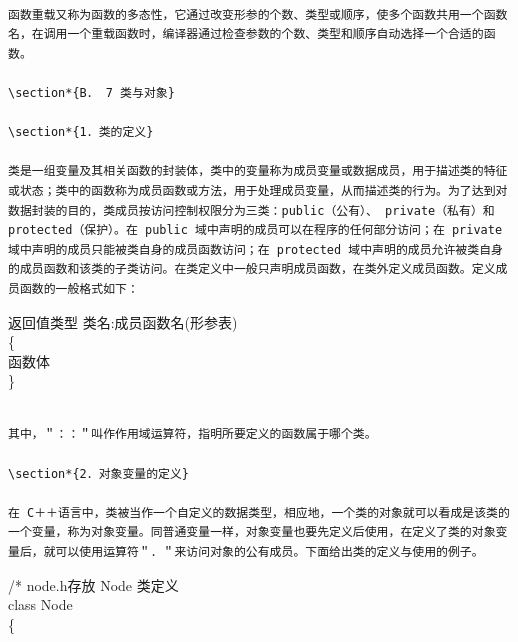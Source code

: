 \documentclass[10pt]{article}
\begin{document}
\begin{verbatim}

函数重载又称为函数的多态性，它通过改变形参的个数、类型或顺序，使多个函数共用一个函数名，在调用一个重载函数时，编译器通过检查参数的个数、类型和顺序自动选择一个合适的函数。

\section*{B． 7 类与对象}

\section*{1．类的定义}

类是一组变量及其相关函数的封装体，类中的变量称为成员变量或数据成员，用于描述类的特征或状态；类中的函数称为成员函数或方法，用于处理成员变量，从而描述类的行为。为了达到对数据封装的目的，类成员按访问控制权限分为三类：public（公有）、 private（私有）和 protected（保护）。在 public 域中声明的成员可以在程序的任何部分访问；在 private 域中声明的成员只能被类自身的成员函数访问；在 protected 域中声明的成员允许被类自身的成员函数和该类的子类访问。在类定义中一般只声明成员函数，在类外定义成员函数。定义成员函数的一般格式如下：
\end{verbatim}

返回值类型 类名:成员函数名(形参表)\\
\{\\
函数体\\
\}

\begin{verbatim}

其中，＂：：＂叫作作用域运算符，指明所要定义的函数属于哪个类。

\section*{2．对象变量的定义}

在 C＋＋语言中，类被当作一个自定义的数据类型，相应地，一个类的对象就可以看成是该类的一个变量，称为对象变量。同普通变量一样，对象变量也要先定义后使用，在定义了类的对象变量后，就可以使用运算符＂．＂来访问对象的公有成员。下面给出类的定义与使用的例子。
\end{verbatim}

/* node.h存放 Node 类定义\\
class Node\\
\{

\begin{verbatim}

\end{verbatim}
\end{document}
